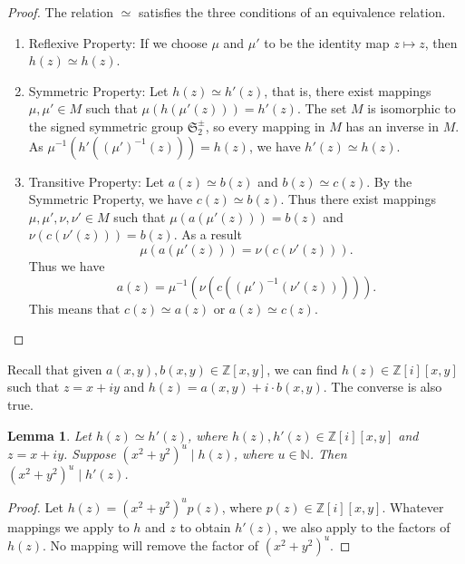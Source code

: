 \documentclass[12pt,table]{article}
\newtheorem{lemma}[theorem]{Lemma}
\newtheorem{corollary}[theorem]{Corollary}
\theoremstyle{definition}
\theoremstyle{remark}
\newcommand{\Nnn}{\mathbb N}
\newcommand{\Zzz}{\mathbb Z}
\newcommand{\vanish}[1]{}
\newcommand{\divides}{\mid}
\numberwithin{equation}{section}
\begin{document}
\begin{proof}
The relation $ \simeq $ satisfies the three conditions of an equivalence relation.
\begin{enumerate}
\item Reflexive Property: If we choose $ \mu $ and $ \mu'$ to be the identity map $ z \mapsto z $, 
then $ h(z) \simeq h(z) $.

\item Symmetric Property: Let  $ h(z) \simeq h'(z) $, that is, there exist mappings 
$ \mu, \mu' \in M $
such that $ \mu( h( \mu'( z ) ) )  = h'(z) $.
The set $M$ is isomorphic to the signed symmetric group $ \mathfrak{S}_2^\pm $,
so every mapping in $M$
has an inverse in $M$. As  $ \mu^{-1}( h'( (\mu')^{-1}( z ) ) )  = h(z) $,
we have $ h'(z) \simeq h(z) $.

\item Transitive Property: Let $ a(z) \simeq b(z) $ and $ b(z) \simeq c(z) $. By the 
Symmetric Property, we have $ c(z) \simeq b(z) $. Thus there exist mappings
$ \mu, \mu', \nu, \nu' \in M $ such that $ \mu( a( \mu'( z ) ) )  = b(z) $ and 
$ \nu( c( \nu'( z ) ) )  = b(z) $. As a result
\[
\mu( a( \mu'( z ) ) ) = \nu( c( \nu'( z ) ) ). 
\]
Thus we have
\[
a(  z  ) = \mu^{-1}( \nu( c( (\mu')^{-1}( \nu'( z ) ) ) ) ).
\]
This means that $ c(z) \simeq a(z) $ or $ a(z) \simeq c(z) $.
\end{enumerate}
\end{proof}

Recall that given $ a(x,y), b(x,y) \in \Zzz[x,y] $,
we can find $ h(z) \in \Zzz [i][x,y] $
such that
$ z = x + iy $
and
$ h(z) = a(x,y) + i \cdot b(x,y) $. 
The converse is also true.



\begin{lemma}
Let $ h(z) \simeq h'(z) $, where $ h(z), h'(z) \in \Zzz[i][x,y] $
and $ z = x+ iy $.
Suppose $ ( x^2 + y^2 ) ^ u \divides h(z) $,
where $ u \in \Nnn $. Then $ ( x^2 + y^2 ) ^ u \divides h'(z) $.
\end{lemma}
   
\begin{proof}
Let $ h(z) = ( x^2 + y^2 ) ^ u  p(z) $, where $ p(z) \in \Zzz [i][x,y] $. 
Whatever mappings we apply to $h$ and $z$
to obtain $ h'(z) $, we also apply to the factors of $ h(z) $. 
No mapping will remove the factor of $ ( x^2 + y^2 ) ^ u $.

\end{proof}

\vanish{
\begin{corollary}
Let $ h(z), h'(z) \in \Zzz[i][x,y] $ with $ z = x+ iy $.
\[
h(z) \simeq h'(z) 
\implies 
( \forall u \in \Nnn \cup \{ 0 \},  ( x^2 + y^2 ) ^ u \divides h(z)  \iff ( x^2 + y^2 ) ^ u \divides h'(z)  )
\]
\end{corollary}
}
\end{document}
